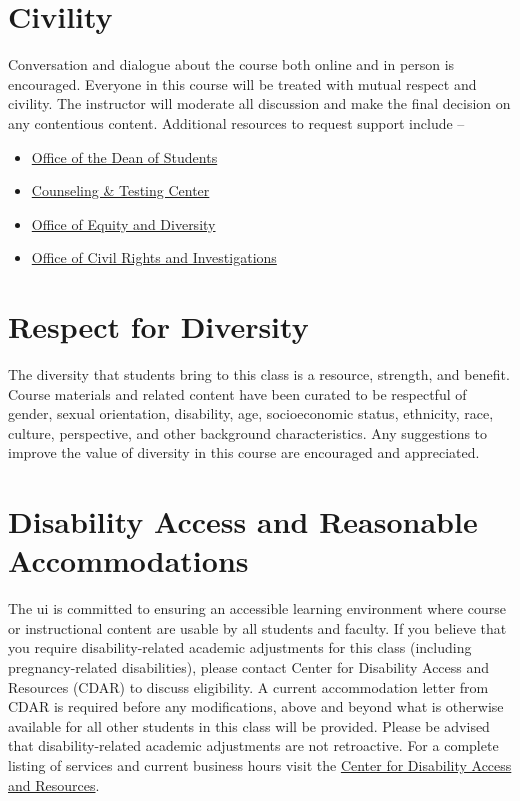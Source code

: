 \documentclass[11pt,letterpaper]{article}
\newcommand{\acl}{\acrlong} %
\begin{document}
\section{Civility}
Conversation and dialogue about the course both online and in person is encouraged. Everyone in this course will be treated with mutual respect and civility. The instructor will moderate all discussion and make the final decision on any contentious content. Additional resources to request support include --
\begin{itemize}    \item\href{https://www.uidaho.edu/student-affairs/dean-of-students}{Office of the Dean of Students}
    \item\href{https://www.uidaho.edu/current-students/ctc/counseling}{Counseling \& Testing Center}
    \item\href{https://www.uidaho.edu/diversity/edu}{Office of Equity and Diversity}
    \item\href{https://www.uidaho.edu/ocri}{Office of Civil Rights and Investigations}
\end{itemize}


\section{Respect for Diversity}
The diversity that students bring to this class is a resource, strength, and benefit. Course materials and related content have been curated to be respectful of gender, sexual orientation, disability, age, socioeconomic status, ethnicity, race, culture, perspective, and other background characteristics. Any suggestions to improve the value of diversity in this course are encouraged and appreciated.


\section{Disability Access and Reasonable Accommodations}
The \acl{ui} is committed to ensuring an accessible learning environment where course or instructional content are usable by all students and faculty. If you believe that you require disability-related academic adjustments for this class (including pregnancy-related disabilities), please contact Center for Disability Access and Resources (CDAR) to discuss eligibility. A current accommodation letter from CDAR is required before any modifications, above and beyond what is otherwise available for all other students in this class will be provided. Please be advised that disability-related academic adjustments are not retroactive. For a complete listing of services and current business hours visit the \href{https://www.uidaho.edu/current-students/cdar}{Center for Disability Access and Resources}.
\end{document}
